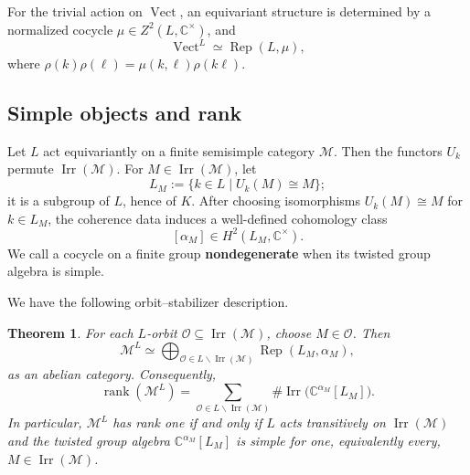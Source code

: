 \documentclass{amsart}
\newtheorem{theorem}{Theorem}[section]
\theoremstyle{definition}
\newcommand{\Irr}{\operatorname{Irr}}
\newcommand{\Rep}{\operatorname{Rep}}
\newcommand{\Vect}{\operatorname{Vect}}
\newcommand{\rank}{\operatorname{rank}}
\newcommand{\M}{\mathscr{M}}
\newcommand{\Ctimes}{\mathbb{C}^{\times}}
\numberwithin{equation}{section}
\begin{document}
For the trivial action on $\Vect$, an equivariant structure is determined by a
normalized cocycle $\mu\in Z^2(L,\Ctimes)$, and
\[
 \Vect^L\simeq\Rep(L,\mu),
\]
where $\rho(k)\rho(\ell)=\mu(k,\ell)\rho(k\ell)$.

\subsection{Simple objects and rank}\label{sec:orbit-stabilizer}

Let $L$ act equivariantly on a finite semisimple category $\M$.  Then the functors $U_k$
permute $\Irr(\M)$.  For $M\in\Irr(\M)$, let
\[
 L_M:=\{k\in L\mid U_k(M)\cong M\};
\]
it is a subgroup of $L$, hence of $K$. After choosing isomorphisms $U_k(M)\cong M$ for $k\in L_M$, the coherence data
induces a well-defined cohomology class
$$[\alpha_M]\in H^2(L_M,\Ctimes).$$ 
We call a cocycle on a finite group
{\bf nondegenerate} when its twisted group algebra is simple.

We have the following orbit--stabilizer description.

\begin{theorem}\label{thm:orbit-stabilizer}
For each $L$-orbit $\mathcal O\subseteq\Irr(\M)$, choose $M\in\mathcal O$.  Then
\[
 \M^L\simeq
 \bigoplus_{\mathcal O\in L\backslash\Irr(\M)}
 \Rep(L_M,\alpha_M),
\]
as an abelian category. Consequently,
\[
 \rank(\M^L)=
 \sum_{\mathcal O\in L\backslash\Irr(\M)}
 \#\Irr\bigl(\mathbb{C}^{\alpha_M}[L_M]\bigr).
\]
In particular, $\M^L$ has rank one if and only if $L$ acts transitively on
$\Irr(\M)$ and the twisted group algebra $\mathbb{C}^{\alpha_M}[L_M]$ is simple for one,
equivalently every, $M\in\Irr(\M)$.
\end{theorem}
\end{document}
